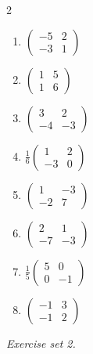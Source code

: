 \begin{multicols}{2}
\begin{enumerate}[label=\arabic*., leftmargin=*, itemsep=1pt]
\item $\left(\begin{smallmatrix}-5 & 2\\ -3 & 1\end{smallmatrix}\right)$
\item $\left(\begin{smallmatrix}1 & 5\\ 1 & 6\end{smallmatrix}\right)$
\item $\left(\begin{smallmatrix}3 & 2\\ -4 & -3\end{smallmatrix}\right)$
\item $\frac{1}{6}\left(\begin{smallmatrix}1 & 2\\ -3 & 0\end{smallmatrix}\right)$
\item $\left(\begin{smallmatrix}1 & -3\\ -2 & 7\end{smallmatrix}\right)$
\item $\left(\begin{smallmatrix}2 & 1\\ -7 & -3\end{smallmatrix}\right)$
\item $\frac{1}{5}\left(\begin{smallmatrix}5 & 0\\ 0 & -1\end{smallmatrix}\right)$
\item $\left(\begin{smallmatrix}-1 & 3\\ -1 & 2\end{smallmatrix}\right)$
\end{enumerate}
\end{multicols}
\par\noindent\emph{Exercise set 2.}\nopagebreak
